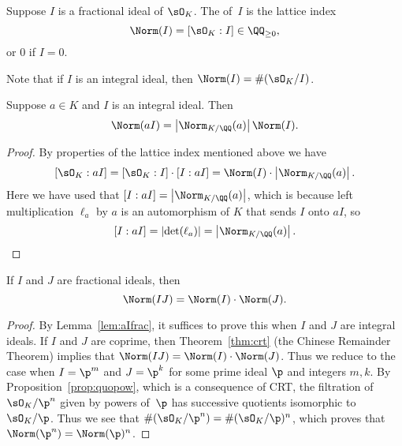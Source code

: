 \begin{definition}
  Suppose $I$ is a fractional ideal of $\sO_K$.  The  of~$I$ is
  the lattice index
  \[
    \Norm(I) = [\sO_K : I] \in \QQ_{\geq 0},
  \]
  or $0$ if $I=0$.
\end{definition}
Note that if $I$ is an integral ideal, then $\Norm(I)=\#(\sO_K/I)$.

\begin{lemma}\label{lem:aIfrac}
  Suppose $a\in K$ and $I$ is an integral ideal.
  Then
  \[
    \Norm(a I) = \left|\Norm_{K/\QQ}(a)\right| \Norm(I).
  \]
\end{lemma}
\begin{proof}
  By properties of the lattice index mentioned above we have
  \[
    [\sO_K : aI] = [\sO_K : I] \cdot [I:aI]
    = \Norm(I) \cdot \left|\Norm_{K/\QQ}(a)\right|.
  \]
  Here we have used that $[I:aI]=\left|\Norm_{K/\QQ}(a)\right|$, which is because left
  multiplication $\ell_a$ by $a$ is an automorphism of $K$ that sends $I$ onto
  $aI$, so $$[I:aI]=\left|\det(\ell_a)\right|=\left|\Norm_{K/\QQ}(a)\right|.$$
\end{proof}

\begin{proposition}
  If $I$ and $J$ are fractional ideals, then
  \[
    \Norm(IJ) = \Norm(I)\cdot \Norm(J).
  \]
\end{proposition}
\begin{proof}
  By Lemma~\ref{lem:aIfrac}, it suffices to prove this when $I$ and $J$ are
  integral ideals.  If $I$ and $J$ are coprime, then
  Theorem~\ref{thm:crt} (the Chinese Remainder Theorem) implies that
  $\Norm(IJ) = \Norm(I)\cdot \Norm(J)$.  Thus we reduce to the case when
  $I=\p^m$ and $J=\p^k$ for some prime ideal $\p$ and integers $m,k$.
  By Proposition~\ref{prop:quopow}, which is
  a consequence of CRT, the filtration of $\sO_K/\p^{n}$ given
  by powers of~$\p$ has successive quotients isomorphic to $\sO_K/\p$.
  Thus  we see that $\#(\sO_K/\p^{n}) = \#(\sO_K/\p)^{n}$, which proves that
  $\Norm(\p^n)=\Norm(\p)^n$.
\end{proof}

